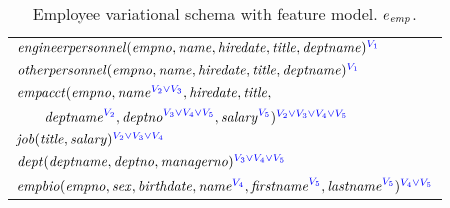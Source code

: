 \begin{table}
\caption[Variational schema of the employee database evolution]{Employee variational schema with feature model.
 \ensuremath{\dimMeta_\employee}.}
\label{tab:emp-vsch}
\begin{center}
\small
\begin{tabular} {!{\color{black}\vrule} l !{\color{black}\vrule}}
\hline
\rule{0pt}{3ex}%
$\engemp(\empno, \name, \hiredate,\titleatt,\deptname)^{\textcolor{blue}
\vOne}$ \\[1.1ex]
$\othemp(\empno, \name, \hiredate, \titleatt, \deptname)^{\textcolor{blue}
\vOne}$ \\[1.1ex]
$\empacct(\empno, \annot [\textcolor{blue}{\vTwo \vee \vThree}] \name,
\hiredate, \titleatt,$ \\
$\qquad\annot[\textcolor{blue} \vTwo]\deptname, \annot
[\textcolor{blue} {\vThree \vee \vFour \vee \vFive}]\deptno,\annot
[\textcolor{blue} \vFive]\salary)^{\textcolor{blue}{\vTwo \vee \vThree \vee
\vFour \vee \vFive}}$ \\[1.1ex]
$\job(\titleatt, \salary)^{\textcolor{blue}{\vTwo \vee \vThree \vee \vFour}}$
\\[1.1ex]
$\dept(\deptname, \deptno, \managerno)^{\textcolor{blue}{\vThree \vee \vFour
\vee \vFive}}$ \\[1.1ex]
$\empbio(\empno, \sex, \birthdate, \annot [\textcolor{blue} \vFour] \name,
\annot[\textcolor{blue}\vFive]{\fname}, \annot[\textcolor{blue}
\vFive]{\lname})^{\textcolor{blue} {\vFour \vee \vFive}}$ \\
\hline
\end{tabular}
\end{center}
\end{table}
